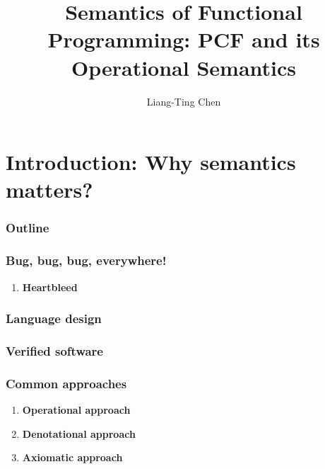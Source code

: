 \title[Operational Semantics]{Semantics of Functional Programming: PCF and its
Operational Semantics}
\author[L.-T. Chen]{Liang-Ting Chen}

\frame{\maketitle}
\frame{\tableofcontents}
\section{Introduction: Why semantics matters?}  
\begin{frame}
  \frametitle{Outline}
\end{frame}
\begin{frame}
  \frametitle{Bug, bug, bug, everywhere!}
  \begin{enumerate}
    \item \textbf{Heartbleed}
  \end{enumerate}
\end{frame}
\begin{frame}
  \frametitle{Language design}
\end{frame}
\begin{frame}
  \frametitle{Verified software}
\end{frame}
\begin{frame}
  \frametitle{Common approaches}
  \begin{enumerate}
    \item \textbf{Operational approach}
    \item \textbf{Denotational approach}
    \item \textbf{Axiomatic approach}
  \end{enumerate}
\end{frame}
